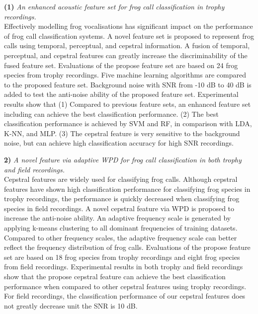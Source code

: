 \textbf{(1)} \textit{An enhanced acoustic feature set for frog call classification in trophy recordings.} 
\\
Effectively modelling frog vocalisations has significant impact on the performance of frog call classification systems. A novel feature set is proposed to represent frog calls using temporal, perceptual, and cepstral information. A fusion of temporal, perceptual, and cepstral features can greatly increase the discriminability of the fused feature set. Evaluations of the propose feature set are based on 24 frog species from trophy recordings. Five machine learning algorithms are compared to the proposed feature set. Background noise with SNR from -10 dB to 40 dB is added to test the anti-noise ability of the proposed feature set. Experimental results show that (1) Compared to previous feature sets, an enhanced feature set including  can achieve the best classification performance. (2) The best classification performance is achieved by SVM and RF, in comparison with LDA, K-NN, and MLP. (3) The cepstral feature is very sensitive to the background noise, but can achieve high classification accuracy for high SNR recordings. 

\textbf{2)} \textit{A novel feature via adaptive WPD for frog call classification in both trophy and field recordings.}
\\
Cepstral features are widely used for classifying frog calls. Although cepstral features have shown high classification performance for classifying frog species in trophy recordings, the performance is quickly decreased when classifying frog species in field recordings. A novel cepstral feature via WPD is proposed to increase the anti-noise ability. An adaptive frequency scale is generated by applying k-means clustering to all dominant frequencies of training datasets. Compared to other frequency scales, the adaptive frequency scale can better reflect the frequency distribution of frog calls. Evaluations of the propose feature set are based on 18 frog species from trophy recordings and eight frog species from field recordings. Experimental results in both trophy and field recordings show that the propose cepstral feature can achieve the best classification performance when compared to other cepstral features using trophy recordings. For field recordings, the classification performance of our cepstral features does not greatly decrease unit the SNR is 10 dB.



